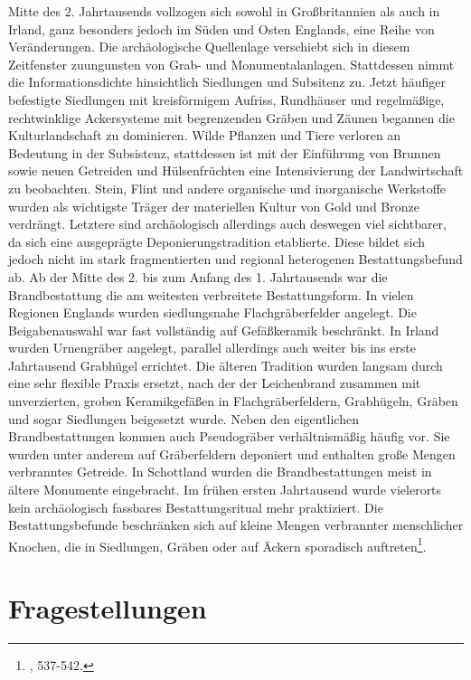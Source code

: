 \documentclass[openany,twoside,twocolumn]{book}
\let\rmarkdownfootnote\footnote%
\def\footnote{\protect\rmarkdownfootnote}
\begin{document}
Mitte des 2. Jahrtausends vollzogen sich sowohl in Großbritannien als
auch in Irland, ganz besonders jedoch im Süden und Osten Englands, eine
Reihe von Veränderungen. Die archäologische Quellenlage verschiebt sich
in diesem Zeitfenster zuungunsten von Grab- und Monumentalanlagen.
Stattdessen nimmt die Informationsdichte hinsichtlich Siedlungen und
Subsitenz zu. Jetzt häufiger befestigte Siedlungen mit kreisförmigem
Aufriss, Rundhäuser und regelmäßige, rechtwinklige Ackersysteme mit
begrenzenden Gräben und Zäunen begannen die Kulturlandschaft zu
dominieren. Wilde Pflanzen und Tiere verloren an Bedeutung in der
Subsistenz, stattdessen ist mit der Einführung von Brunnen sowie neuen
Getreiden und Hülsenfrüchten eine Intensivierung der Landwirtschaft zu
beobachten. Stein, Flint und andere organische und inorganische
Werkstoffe wurden als wichtigste Träger der materiellen Kultur von Gold
und Bronze verdrängt. Letztere sind archäologisch allerdings auch
deswegen viel sichtbarer, da sich eine ausgeprägte Deponierungstradition
etablierte. Diese bildet sich jedoch nicht im stark fragmentierten und
regional heterogenen Bestattungsbefund ab. Ab der Mitte des 2. bis zum
Anfang des 1. Jahrtausends war die Brandbestattung die am weitesten
verbreitete Bestattungsform. In vielen Regionen Englands wurden
siedlungsnahe Flachgräberfelder angelegt. Die Beigabenauswahl war fast
vollständig auf Gefäßkeramik beschränkt. In Irland wurden Urnengräber
angelegt, parallel allerdings auch weiter bis ins erste Jahrtausend
Grabhügel errichtet. Die älteren Tradition wurden langsam durch eine
sehr flexible Praxis ersetzt, nach der der Leichenbrand zusammen mit
unverzierten, groben Keramikgefäßen in Flachgräberfeldern, Grabhügeln,
Gräben und sogar Siedlungen beigesetzt wurde. Neben den eigentlichen
Brandbestattungen kommen auch Pseudogräber verhältnismäßig häufig vor.
Sie wurden unter anderem auf Gräberfeldern deponiert und enthalten große
Mengen verbranntes Getreide. In Schottland wurden die Brandbestattungen
meist in ältere Monumente eingebracht. Im frühen ersten Jahrtausend
wurde vielerorts kein archäologisch fassbares Bestattungsritual mehr
praktiziert. Die Bestattungsbefunde beschränken sich auf kleine Mengen
verbrannter menschlicher Knochen, die in Siedlungen, Gräben oder auf
Äckern sporadisch auftreten\footnote{\textcite{roberts_britain_2013},
  537-542.}.

\hypertarget{fragestellungen}{%
\section{Fragestellungen}\label{fragestellungen}}
\end{document}
